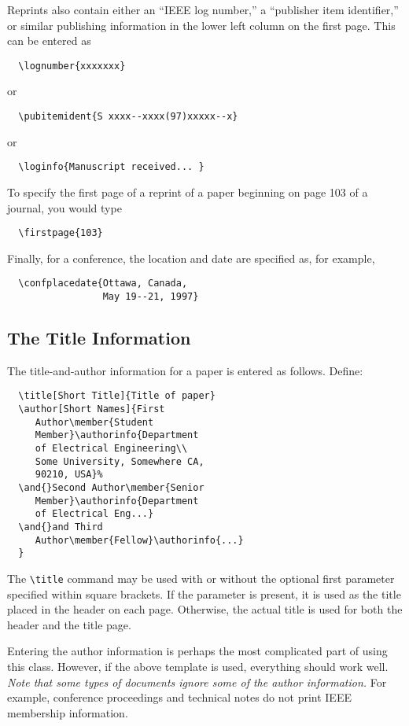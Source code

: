 \documentclass[%
	final,
	reprint,
	notitlepage,
	narroweqnarray,
	inline,
	twoside,
        invited,
	]{ieee}
\begin{document}
Reprints also contain either an ``IEEE log number,'' a ``publisher
item identifier,'' or similar publishing information in the lower left
column on the first page. This can be entered as
\begin{verbatim}
  \lognumber{xxxxxxx}
\end{verbatim}
or
\begin{verbatim}
  \pubitemident{S xxxx--xxxx(97)xxxxx--x}
\end{verbatim}
or
\begin{verbatim}
  \loginfo{Manuscript received... }
\end{verbatim}
To specify the first page of a reprint of a paper beginning on page 
103 of a journal, you would type
\begin{verbatim}
  \firstpage{103}
\end{verbatim}
Finally, for a conference, the location and date are specified as, for
example,
\begin{verbatim}
  \confplacedate{Ottawa, Canada,  
                 May 19--21, 1997}
\end{verbatim}

\subsection{The Title Information}

The title-and-author information for a paper is entered as follows.
Define:
\begin{verbatim}
  \title[Short Title]{Title of paper}
  \author[Short Names]{First 
     Author\member{Student 
     Member}\authorinfo{Department 
     of Electrical Engineering\\ 
     Some University, Somewhere CA, 
     90210, USA}% 
  \and{}Second Author\member{Senior 
     Member}\authorinfo{Department 
     of Electrical Eng...}
  \and{}and Third 
     Author\member{Fellow}\authorinfo{...}
  }
\end{verbatim}

The \verb|\title| command may be used with or without the optional
first parameter specified within square brackets. If the parameter is
present, it is used as the title placed in the header on each page.
Otherwise, the actual title is used for both the header and the title
page.

Entering the author information is perhaps the most complicated part
of using this class. However, if the above template is used,
everything should work well. \emph{Note that some types of documents
ignore some of the author information.} For example, conference
proceedings and technical notes do not print IEEE membership
information.
\end{document}
